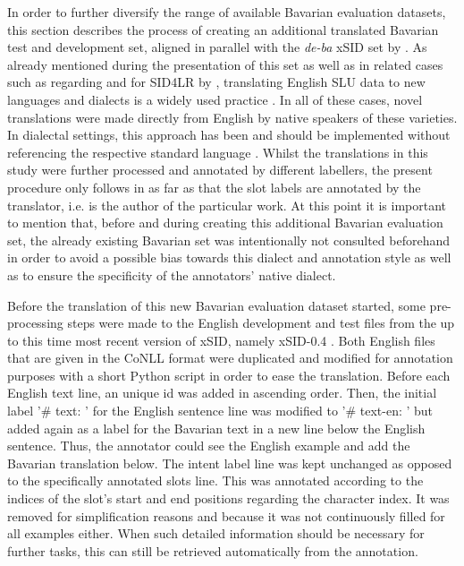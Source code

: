 \documentclass[11pt,a4paper,twoside,openright]{scrbook}
\begin{document}
In order to further diversify the range of available Bavarian evaluation datasets, this section describes the process of creating an additional translated Bavarian test and development set, aligned in parallel with the \textit{de-ba} xSID set by \citet{winkler-etal-2024-slot-intent}. As already mentioned during the presentation of this set as well as in related cases such as regarding \citet{upandhyay_atis_zeroshot} and for SID4LR by \citet{2023-findings-vardial}, translating English SLU data to new languages and dialects is a widely used practice \citep{van-der-goot-etal-2021-masked}. In all of these cases, novel translations were made directly from English by native speakers of these varieties. In dialectal settings, this approach has been and should be implemented without referencing the respective standard language \citep{2023-findings-vardial}. Whilst the translations in this study were further processed and annotated by different labellers, the present procedure only follows \citet{winkler-etal-2024-slot-intent} in as far as that the slot labels are annotated by the translator, i.e. is the author of the particular work. At this point it is important to mention that, before and during creating this additional Bavarian evaluation set, the already existing Bavarian set was intentionally not consulted beforehand in order to avoid a possible bias towards this dialect and annotation style as well as to ensure the specificity of the annotators' native dialect.

Before the translation of this new Bavarian evaluation dataset started, some pre-processing steps were made to the English development and test files from the up to this time most recent version of xSID, namely xSID-0.4 \citep{van-der-goot-etal-2021-masked, 2023-findings-vardial}. Both English files that are given in the CoNLL format \citep{tjong-kim-sang-de-meulder-2003-introduction} were duplicated and modified for annotation purposes with a short Python script in order to ease the translation. Before each English text line, an unique id was added in ascending order. Then, the initial label '\# text: ' for the English sentence line was modified to '\# text-en: ' but added again as a label for the Bavarian text in a new line below the English sentence. Thus, the annotator could see the English example and add the Bavarian translation below. The intent label line was kept unchanged as opposed to the specifically annotated slots line. This was annotated according to the indices of the slot's start and end positions regarding the character index. It was removed for simplification reasons and because it was not continuously filled for all examples either. When such detailed information should be necessary for further tasks, this can still be retrieved automatically from the annotation. 
\end{document}
